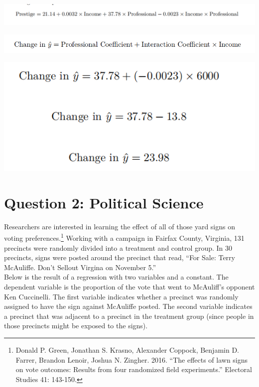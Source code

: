 \documentclass[12pt,letterpaper]{article}
\begin{document}
\begin{enumerate}
	 
	\centering 
    \includegraphics[width=0.9\linewidth]{q7}
     
    \centering 
    \includegraphics[width=0.9\linewidth]{q8}
    
    \centering 
    \includegraphics[width=0.6\linewidth]{q9}
     
	
\end{enumerate}

\newpage

\section*{Question 2: Political Science}
\vspace{.25cm}
\noindent 	Researchers are interested in learning the effect of all of those yard signs on voting preferences.\footnote{Donald P. Green, Jonathan	S. Krasno, Alexander Coppock, Benjamin D. Farrer,	Brandon Lenoir, Joshua N. Zingher. 2016. ``The effects of lawn signs on vote outcomes: Results from four randomized field experiments.'' Electoral Studies 41: 143-150. } Working with a campaign in Fairfax County, Virginia, 131 precincts were randomly divided into a treatment and control group. In 30 precincts, signs were posted around the precinct that read, ``For Sale: Terry McAuliffe. Don't Sellout Virgina on November 5.'' \\

Below is the result of a regression with two variables and a constant.  The dependent variable is the proportion of the vote that went to McAuliff's opponent Ken Cuccinelli. The first variable indicates whether a precinct was randomly assigned to have the sign against McAuliffe posted. The second variable indicates
a precinct that was adjacent to a precinct in the treatment group (since people in those precincts might be exposed to the signs).  \\
\end{document}

